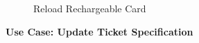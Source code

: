 \documentclass[a4paper,12pt]{report}
\begin{document}
\begin{figure}[!htbp]
	\caption{\label{fig:Use Case Model : } Reload Rechargeable Card}	
\end{figure}



\vspace{0.5cm}
\textbf{\large Use Case: Update Ticket Specification}
\\
\end{document}
